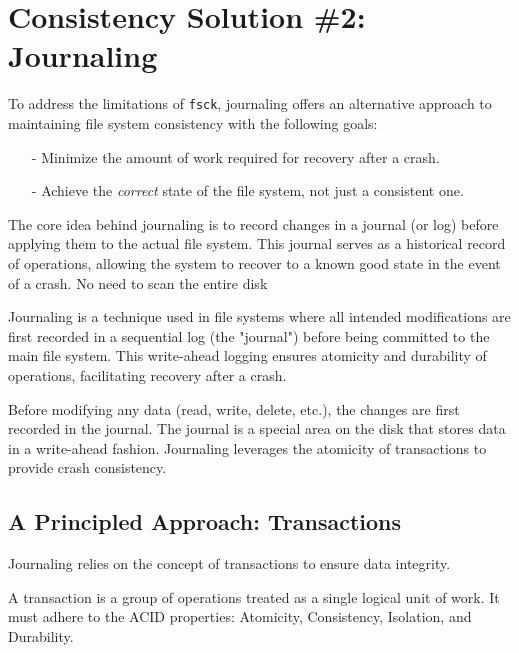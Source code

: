 \documentclass[../../compsys.tex]{subfiles}
\begin{document}
\section{Consistency Solution \#2: Journaling}

To address the limitations of \texttt{fsck}, journaling offers an alternative approach to maintaining file system consistency with the following goals:

\begin{itemize}
    \item [-] Minimize the amount of work required for recovery after a crash.
    \item [-] Achieve the \textit{correct} state of the file system, not just a consistent one.
\end{itemize}

The core idea behind journaling is to record changes in a journal (or log) before applying them to the actual file system. This journal serves as a historical record of operations, allowing the system to recover to a known good state in the event of a crash. No need to scan the entire disk
\vspace{5px}
\begin{definition}[Journaling]
    Journaling is a technique used in file systems where all intended modifications are first recorded in a sequential log (the "journal") before being committed to the main file system. This write-ahead logging ensures atomicity and durability of operations, facilitating recovery after a crash.
\end{definition}
\vspace{5px}
Before modifying any data (read, write, delete, etc.), the changes are first recorded in the journal. The journal is a special area on the disk that stores data in a write-ahead fashion. Journaling leverages the atomicity of transactions to provide crash consistency.

\subsection{A Principled Approach: Transactions}

Journaling relies on the concept of transactions to ensure data integrity.

\begin{definition}[Transaction]
    A transaction is a group of operations treated as a single logical unit of work. It must adhere to the ACID properties: Atomicity, Consistency, Isolation, and Durability.
\end{definition}
\end{document}
